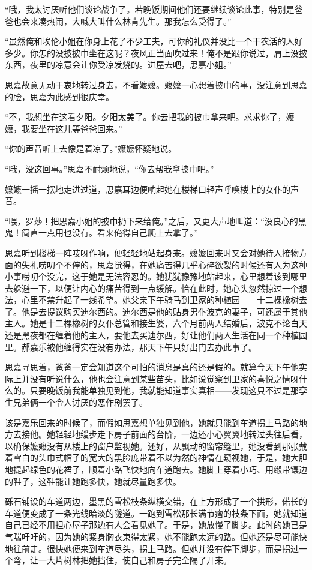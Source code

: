 \par “哦，我太讨厌听他们谈论战争了。若晚饭期间他们还要继续谈论此事，特别是爸爸也会来凑热闹，大喊大叫什么林肯先生。那我怎么受得了。”
\par “虽然俺和埃伦小姐在你身上花了不少工夫，可你的礼仪并没比一个干农活的人好多少。你怎的没披披巾坐在这呢？夜风正当面吹过来！俺不是跟你说过，肩上没披东西，夜里的凉意会让你受凉发烧的。进屋去吧，思嘉小姐。”
\par 思嘉故意无动于衷地转过身去，不看嬷嬷。嬷嬷一心想着披巾的事，没注意到思嘉的脸，思嘉为此感到很庆幸。
\par “不，我想坐在这看夕阳。夕阳太美了。你去把我的披巾拿来吧。求求你了，嬷嬷，我要坐在这儿等爸爸回来。”
\par “你的声音听上去像是着凉了。”嬷嬷怀疑地说。
\par “哦，没这回事。”思嘉不耐烦地说，“你去帮我拿披巾吧。”
\par 嬷嬷一摇一摆地走进过道，思嘉耳边便响起她在楼梯口轻声呼唤楼上的女仆的声音。
\par “喂，罗莎！把思嘉小姐的披巾扔下来给俺。”之后，又更大声地叫道：“没良心的黑鬼！简直一点用也没有。看来俺得自己爬上去拿了。”
\par 思嘉听到楼梯一阵吱呀作响，便轻轻地站起身来。嬷嬷回来时又会对她待人接物方面的失礼唠叨个不停的，思嘉觉得，在她痛苦得几乎心碎欲裂的时候还有人为这种小事唠叨个没完，这于她是无法容忍的。她犹犹豫豫地站起来，心里想着该到哪里去躲避一下，以便让内心的痛苦得到一点缓解。恰在此时，她心头忽然掠过一个想法，心里不禁升起了一线希望。她父亲下午骑马到卫家的种植园——十二棵橡树去了。他是去提议购买迪尔西的。迪尔西是他的贴身男仆波克的妻子，可还属于其他主人。她是十二棵橡树的女仆总管和接生婆，六个月前两人结婚后，波克不论白天还是黑夜都在缠着他的主人，要他去买迪尔西，好让他们两人生活在同一个种植园里。郝嘉乐被他缠得实在没有办法，那天下午只好出门去办此事了。
\par 思嘉寻思着，爸爸一定会知道这个可怕的消息是真的还是假的。就算今天下午他实际上并没有听说什么，他也会注意到某些苗头，比如说觉察到卫家的喜悦之情呀什么的。只要晚饭前我能单独见到他，我就能知道事实真相——发现这只不过是那孪生兄弟俩一个令人讨厌的恶作剧罢了。
\par 该是嘉乐回来的时候了，而假如思嘉想单独见到他，她就只能到车道拐上马路的地方去接他。她轻轻地缓步走下房子前面的台阶，一边还小心翼翼地转过头往后看，以确保嬷嬷没有从楼上的窗户监视她。还好，从飘动的窗帘缝里，她没看到那张戴着雪白的头巾式帽子的宽大的黑脸庞带着不以为然的神情在窥视她，于是，她大胆地提起绿色的花裙子，顺着小路飞快地向车道跑去。她脚上穿着小巧、用缎带镶边的鞋子，这鞋能让她跑多快，她就尽量跑多快。
\par 砾石铺设的车道两边，墨黑的雪松枝条纵横交错，在上方形成了一个拱形，偌长的车道便变成了一条光线暗淡的隧道。一跑到雪松那长满节瘤的枝条下面，她就知道自己已经不用担心屋子那边有人会看见她了。于是，她放慢了脚步。此时的她已是气喘吁吁的，因为她的紧身胸衣束得太紧，她不能跑太远的路。但她还是尽可能快地往前走。很快她便来到车道尽头，拐上马路。但她并没有停下脚步，而是拐过一个弯，让一大片树林把她挡住，使自己和房子完全隔了开来。
